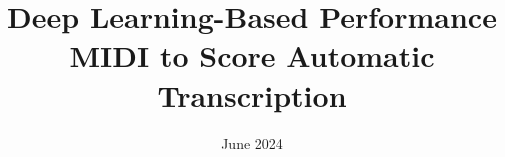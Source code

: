 \documentclass[licencjacka,en]{pracamgr}
\title{Deep Learning-Based Performance MIDI to Score Automatic Transcription}
\date{June 2024}
\begin{document}
\maketitle





















\nocite{ABC2013}
\nocite{Benetos2013}
\nocite{Benetos2019}
\nocite{Berenzweig2003}
\nocite{Bhattarai2023}
\nocite{Chopin1839}
\nocite{Cogliati2016}
\nocite{Cogliati2017}
\nocite{Desain1989}
\nocite{Duan2014}
\nocite{Francesco2020}
\nocite{Good2001}
\nocite{Hiramatsu2021}
\nocite{Huber2007}
\nocite{ISO1975}
\nocite{ISO2008}
\nocite{Kim2018}
\nocite{Kostka1994}
\nocite{Krueger1996}
\nocite{LilyPond2002}
\nocite{Liu2022}
\nocite{MIDI1996}
\nocite{Oliveira2017}
\nocite{Orio2006}
\nocite{McLeod2018}
\nocite{McLeod2019}
\nocite{Oliveira2017}
\nocite{Read1969}
\nocite{Rudin1976}
\nocite{Riley2023}
\nocite{Sethares2005}
\nocite{Schaeffer2012}
\nocite{Schedl2014}
\nocite{Smith1999}
\nocite{Suzuki2021}
\nocite{Temperley2009}
\nocite{Wiki2024A}
\nocite{Wiki2024B}
\nocite{Ycart2018}


\end{document}
